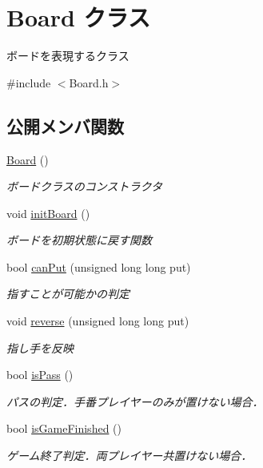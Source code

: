 \hypertarget{class_board}{}\section{Board クラス}
\label{class_board}


ボードを表現するクラス  




{\ttfamily \#include $<$Board.\+h$>$}

\subsection*{公開メンバ関数}
\begin{DoxyCompactItemize}
\item 
\mbox{\hyperlink{class_board_a9ee491d4fea680cf69b033374a9fdfcb}{Board}} ()
\begin{DoxyCompactList}\small\item\em ボードクラスのコンストラクタ \end{DoxyCompactList}\item 
void \mbox{\hyperlink{class_board_a67cf113c045c8aec1565f48eef8e5770}{init\+Board}} ()
\begin{DoxyCompactList}\small\item\em ボードを初期状態に戻す関数 \end{DoxyCompactList}\item 
bool \mbox{\hyperlink{class_board_a34d2b9e0e4ef4e397741607072f6f88d}{can\+Put}} (unsigned long long put)
\begin{DoxyCompactList}\small\item\em 指すことが可能かの判定 \end{DoxyCompactList}\item 
void \mbox{\hyperlink{class_board_abd32a0744a94da0c111d067a062012c4}{reverse}} (unsigned long long put)
\begin{DoxyCompactList}\small\item\em 指し手を反映 \end{DoxyCompactList}\item 
bool \mbox{\hyperlink{class_board_a451dfe3ec3bdc5bac1a7e78637c9cb3d}{is\+Pass}} ()
\begin{DoxyCompactList}\small\item\em パスの判定．手番プレイヤーのみが置けない場合． \end{DoxyCompactList}\item 
bool \mbox{\hyperlink{class_board_a2572833882a68b3293fe15842b76c33f}{is\+Game\+Finished}} ()
\begin{DoxyCompactList}\small\item\em ゲーム終了判定．両プレイヤー共置けない場合． \end{DoxyCompactList}\item 

\end{DoxyCompactItemize}
